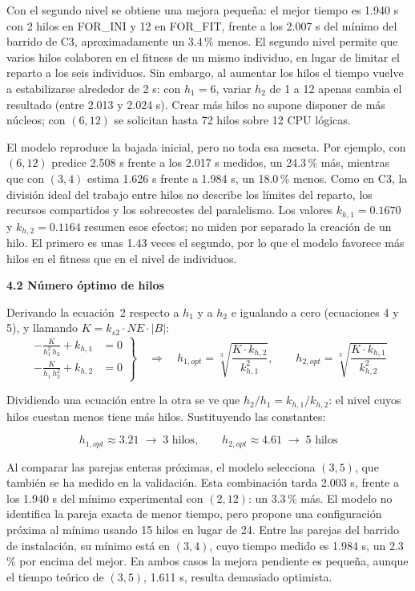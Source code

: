 \documentclass[12pt]{article}
\begin{document}
\begin{enumerate}
Con el segundo nivel se obtiene una mejora pequeña: el mejor tiempo es 1.940 s con 2 hilos en FOR\_INI y 12 en FOR\_FIT, frente a los 2.007 s del mínimo del barrido de C3, aproximadamente un 3.4\,\% menos. El segundo nivel permite que varios hilos colaboren en el fitness de un mismo individuo, en lugar de limitar el reparto a los seis individuos. Sin embargo, al aumentar los hilos el tiempo vuelve a estabilizarse alrededor de 2 s: con $h_1 = 6$, variar $h_2$ de 1 a 12 apenas cambia el resultado (entre 2.013 y 2.024 s). Crear más hilos no supone disponer de más núcleos; con $(6,12)$ se solicitan hasta 72 hilos sobre 12 CPU lógicas.

El modelo reproduce la bajada inicial, pero no toda esa meseta. Por ejemplo, con $(6,12)$ predice 2.508 s frente a los 2.017 s medidos, un 24.3\,\% más, mientras que con $(3,4)$ estima 1.626 s frente a 1.984 s, un 18.0\,\% menos. Como en C3, la división ideal del trabajo entre hilos no describe los límites del reparto, los recursos compartidos y los sobrecostes del paralelismo. Los valores $k_{h,1} = 0.1670$ y $k_{h,2} = 0.1164$ resumen esos efectos; no miden por separado la creación de un hilo. El primero es unas 1.43 veces el segundo, por lo que el modelo favorece más hilos en el fitness que en el nivel de individuos.

\medskip
\noindent\textbf{4.2 Número óptimo de hilos}\par
\smallskip

Derivando la ecuación~2 respecto a $h_1$ y a $h_2$ e igualando a cero (ecuaciones 4 y 5), y llamando $K = k_{s2} \cdot NE \cdot |B|$:
\[
\left.
\begin{aligned}
-\frac{K}{h_1^2 \, h_2} + k_{h,1} &= 0 \\
-\frac{K}{h_1 \, h_2^2} + k_{h,2} &= 0
\end{aligned}
\right\}
\quad\Rightarrow\quad
h_{1,opt} = \sqrt[3]{\frac{K \cdot k_{h,2}}{k_{h,1}^2}}, \qquad
h_{2,opt} = \sqrt[3]{\frac{K \cdot k_{h,1}}{k_{h,2}^2}}
\]

Dividiendo una ecuación entre la otra se ve que $h_2 / h_1 = k_{h,1} / k_{h,2}$: el nivel cuyos hilos cuestan menos tiene más hilos. Sustituyendo las constantes:

\[
h_{1,opt} \approx 3.21 \;\rightarrow\; 3 \text{ hilos}, \qquad h_{2,opt} \approx 4.61 \;\rightarrow\; 5 \text{ hilos}
\]

Al comparar las parejas enteras próximas, el modelo selecciona $(3,5)$, que también se ha medido en la validación. Esta combinación tarda 2.003 s, frente a los 1.940 s del mínimo experimental con $(2,12)$: un 3.3\,\% más. El modelo no identifica la pareja exacta de menor tiempo, pero propone una configuración próxima al mínimo usando 15 hilos en lugar de 24. Entre las parejas del barrido de instalación, su mínimo está en $(3,4)$, cuyo tiempo medido es 1.984 s, un 2.3\,\% por encima del mejor. En ambos casos la mejora pendiente es pequeña, aunque el tiempo teórico de $(3,5)$, 1.611 s, resulta demasiado optimista.


\end{enumerate}
\end{document}

